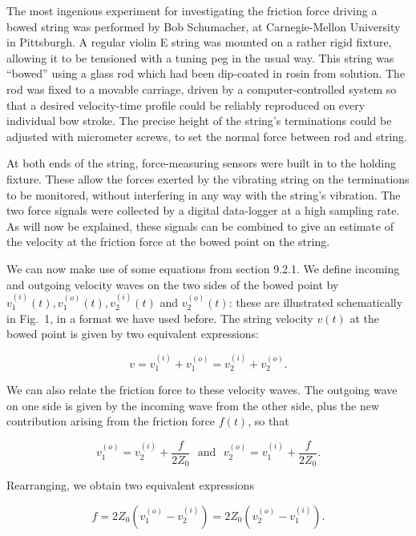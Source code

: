   The most ingenious experiment for investigating the friction force driving a 
  bowed string was performed by Bob Schumacher, at Carnegie-Mellon University 
  in Pittsburgh. A regular violin E string was mounted on a rather rigid 
  fixture, allowing it to be tensioned with a tuning peg in the usual way. This 
  string was ``bowed'' using a glass rod which had been dip-coated in rosin 
  from solution. The rod was fixed to a movable carriage, driven by a 
  computer-controlled system so that a desired velocity-time profile could be 
  reliably reproduced on every individual bow stroke. The precise height of the 
  string's terminations could be adjusted with micrometer screws, to set the 
  normal force between rod and string. 

  At both ends of the string, force-measuring sensors were built in to the 
  holding fixture. These allow the forces exerted by the vibrating string on 
  the terminations to be monitored, without interfering in any way with the 
  string's vibration. The two force signals were collected by a digital 
  data-logger at a high sampling rate. As will now be explained, these signals 
  can be combined to give an estimate of the velocity at the friction force at 
  the bowed point on the string. 

  We can now make use of some equations from section 9.2.1. We define incoming 
  and outgoing velocity waves on the two sides of the bowed point by 
  $v_1^{(i)}(t), v_1^{(o)}(t), v_2^{(i)}(t)$ and $v_2^{(o)}(t)$: these are 
  illustrated schematically in Fig.\ 1, in a format we have used before. The 
  string velocity $v(t)$ at the bowed point is given by two equivalent 
  expressions: 

  \begin{equation*}v=v_1^{(i)}+v_1^{(o)}=v_2^{(i)}+v_2^{(o)} . 
  \tag{1}\end{equation*} 

  We can also relate the friction force to these velocity waves. The outgoing 
  wave on one side is given by the incoming wave from the other side, plus the 
  new contribution arising from the friction force $f(t)$, so that 

  \begin{equation*}v_1^{(o)} = v_2^{(i)} + \dfrac{f}{2Z_0} \mathrm{~~~ and~~~} 
  v_2^{(o)} = v_1^{(i)} + \dfrac{f}{2Z_0} . \tag{2}\end{equation*} 

  Rearranging, we obtain two equivalent expressions 

  \begin{equation*}f=2Z_0(v_1^{(o)}-v_2^{(i)})=2Z_0(v_2^{(o)}-v_1^{(i)}). 
  \tag{3}\end{equation*} 

